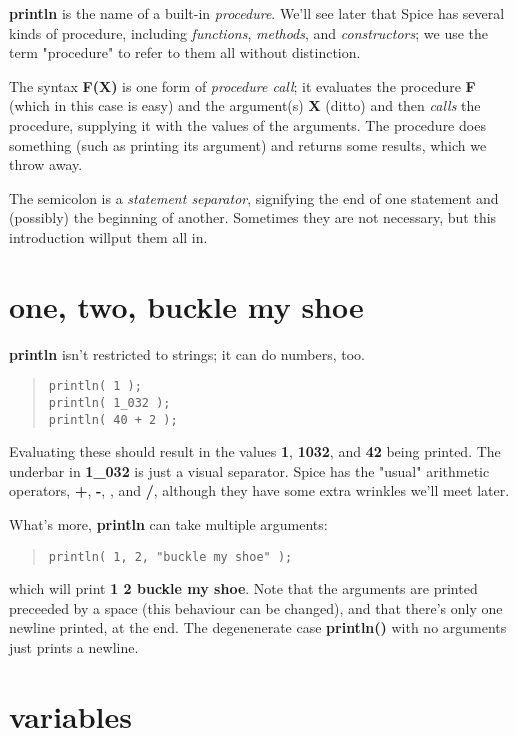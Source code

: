 \documentclass{report}
\begin{document}
{\bf println} is the name of a built-in {\em procedure}. We'll see later that Spice
has several kinds of procedure, including {\em functions}, {\em methods}, and
{\em constructors}; we use the term "procedure" to refer to them all without
distinction.

The syntax {\bf F(X)} is one form of {\em procedure call}; it evaluates the procedure
{\bf F} (which in this case is easy) and the argument(s) {\bf X} (ditto) and then
{\em calls} the procedure, supplying it with the values of the arguments. The
procedure does something (such as printing its argument) and returns some
results, which we throw away.

The semicolon is a {\em statement separator}, signifying the end of one statement
and (possibly) the beginning of another. Sometimes they are not necessary, but
this introduction willput them all in.\section{one, two, buckle my shoe}


{\bf println} isn't restricted to strings; it can do numbers, too.

\begin{quote}
\begin{verbatim}
println( 1 );
println( 1_032 );
println( 40 + 2 );
\end{verbatim}
\end{quote}
Evaluating these should result in the values {\bf 1}, {\bf 1032}, and {\bf 42} being
printed. The underbar in {\bf 1\_032} is just a visual separator. Spice has the
"usual" arithmetic operators, {\bf +}, {\bf -}, {\bf *}, and {\bf /}, although they have some
extra wrinkles we'll meet later.

What's more, {\bf println} can take multiple arguments:

\begin{quote}
\begin{verbatim}
println( 1, 2, "buckle my shoe" );
\end{verbatim}
\end{quote}
which will print {\bf 1 2 buckle my shoe}. Note that the arguments are printed
preceeded by a space (this behaviour can be changed), and that there's
only one newline printed, at the end. The degenenerate case {\bf println()} with
no arguments just prints a newline.\section{variables}
\end{document}
